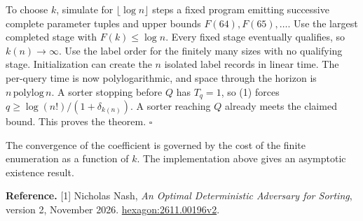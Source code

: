 \documentclass[11pt,a4paper]{article}
\begin{document}
To choose $k$, simulate for $\lfloor\log n\rfloor$ steps a fixed program emitting
successive complete parameter tuples and upper bounds $F(64),F(65),\ldots$.
Use the largest completed stage with $F(k)\le\log n$. Every fixed stage
eventually qualifies, so $k(n)\to\infty$. Use the label order for the finitely
many sizes with no qualifying stage. Initialization can create the $n$ isolated
label records in linear time. The per-query time is now polylogarithmic, and
space through the horizon is $n\,\mathrm{polylog}\,n$. A sorter stopping before
$Q$ has $T_q=1$, so (1) forces $q\ge\log(n!)/(1+\delta_{k(n)})$. A sorter
reaching $Q$ already meets the claimed bound. This proves the theorem.
\hfill$\square$

The convergence of the coefficient is governed by the cost of the finite
enumeration as a function of $k$. The implementation above gives an asymptotic
existence result.

\vfill
{\small\textbf{Reference.} [1] Nicholas Nash, \emph{An Optimal Deterministic
Adversary for Sorting}, version 2, November 2026.
\href{https://hexagonmath.org/2611.00196v2}{hexagon:2611.00196v2}.}
\end{document}
